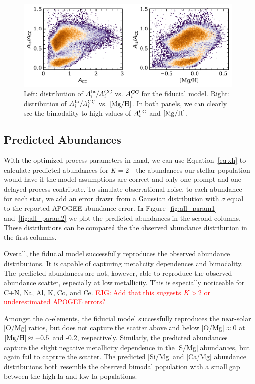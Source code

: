 \documentclass[modern]{aastex631}
\newcommand{\mgh}{[{\rm Mg}/{\rm H}]}
\newcommand{\Acc}{A^{\rm CC}_{i}}
\newcommand{\AIa}{A^{\rm Ia}_{i}}
\newcommand{\ejg}[1]{\textcolor{red}{EJG: #1}}
\begin{document}
\begin{figure}[htb!]
    \centering
    \includegraphics[width=.8\textwidth]{Paper/Figures/As.pdf}
    \caption{Left: distribution of $\AIa/\Acc$ vs. $\Acc$ for the fiducial model. Right: distribution of $\AIa/\Acc$ vs. $\mgh$. In both panels, we can clearly see the bimodality to high values of $\Acc$ and $\mgh$.}
    \label{fig:As}
\end{figure}

\subsection{Predicted Abundances} \label{subsec:preds}

With the optimized process parameters in hand, we can use Equation~\ref{eq:xh} to calculate predicted abundances for $K=2$---the abundances our stellar population would have if the model assumptions are correct and only one prompt and one delayed process contribute. To simulate observational noise, to each abundance for each star, we add an error drawn from a Gaussian distribution with $\sigma$ equal to the reported APOGEE abundance error. In Figure~\ref{fig:all_param1} and~\ref{fig:all_param2} we plot the predicted abundances in the second columns. These distributions can be compared the the observed abundance distribution in the first columns.

Overall, the fiducial model successfully reproduces the observed abundance distributions. It is capable of capturing metalicity dependences and bimodality. The predicted abundances are not, however, able to reproduce the observed abundance scatter, especially at low metallicity. This is especially noticeable for C+N, Na, Al, K, Co, and Ce. \ejg{Add that this suggests $K>2$ or underestimated APOGEE errors?}

Amongst the $\alpha$-elements, the fiducial model successfully reproduces the near-solar [O/Mg] ratios, but does not capture the scatter above and below [O/Mg]$\approx 0$ at $\mgh\approx-0.5$ and -0.2, respectively. Similarly, the predicted abundances capture the slight negative metallicity dependence in the [S/Mg] abundances, but again fail to capture the scatter. The predicted [Si/Mg] and [Ca/Mg] abundance distributions both resemble the observed bimodal population with a small gap between the high-Ia and low-Ia populations. 
\end{document}
